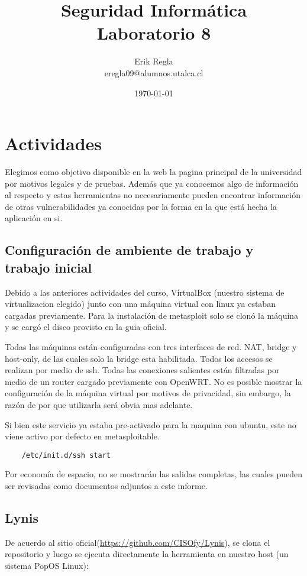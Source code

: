 \documentclass[11pt]{utalcaDoc}
\title{{\bf Seguridad Informática}\\ Laboratorio 8}
\author{Erik Regla\\ eregla09@alumnos.utalca.cl}
\date{\today}
\begin{document}
\maketitle
\newpage
\tableofcontents
\newpage

\section{Actividades}

Elegimos como objetivo disponible en la web la pagina principal de la universidad por motivos legales y de pruebas. Además que ya conocemos algo de información al respecto y estas herramientas no necesariamente pueden encontrar información de otras vulnerabilidades ya conocidas por la forma en la que está hecha la aplicación en si.


\subsection{Configuración de ambiente de trabajo y trabajo inicial}
Debido a las anteriores actividades del curso, VirtualBox (nuestro sistema de virtualizacion elegido) junto con una máquina virtual con linux ya estaban cargadas previamente. Para la instalación de metasploit solo se clonó la máquina y se cargó el disco provisto en la guia oficial.

Todas las máquinas están configuradas con tres interfaces de red. NAT, bridge y host-only, de las cuales solo la bridge esta habilitada. Todos los accesos se realizan por medio de ssh. Todas las conexiones salientes están filtradas por medio de un router cargado previamente con OpenWRT. No es posible mostrar la configuración de la máquina virtual por motivos de privacidad, sin embargo, la razón de por que utilizarla será obvia mas adelante.

Si bien este servicio ya estaba pre-activado para la maquina con ubuntu, este no viene activo por defecto en metasploitable.

\begin{verbatim}
	/etc/init.d/ssh start
\end{verbatim}

Por economía de espacio, no se mostrarán las salidas completas, las cuales pueden ser revisadas como documentos adjuntos a este informe.


\subsection{Lynis}
De acuerdo al sitio oficial(\url{https://github.com/CISOfy/Lynis}), se clona el repositorio y luego se ejecuta directamente la herramienta en nuestro host (un sistema PopOS Linux):
\end{document}
